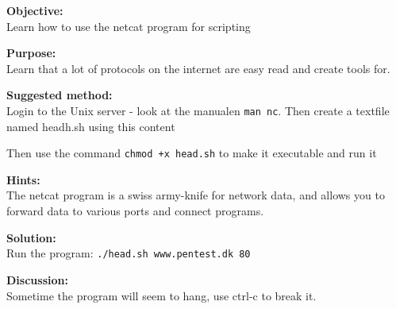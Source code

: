 \documentclass[a4paper,11pt,notitlepage]{report}
\begin{document}
{\bf Objective:} \\
Learn how to use the netcat program for scripting

{\bf Purpose:}\\
Learn that a lot of protocols on the internet are easy read and create tools for.

{\bf Suggested method:} \\
Login to the Unix server - look at the manualen \verb+man nc+.
Then create a textfile named headh.sh using this content
\begin{alltt}

\end{alltt}

Then use the command \verb#chmod +x head.sh# to make it executable and run it

{\bf Hints:}\\
The netcat program is a swiss army-knife for network data, and allows you to forward data to various ports and connect programs.

{\bf Solution:}\\
Run the program: \verb+./head.sh www.pentest.dk 80+


{\bf Discussion:}\\

Sometime the program will seem to hang, use ctrl-c to break it.
\end{document}
